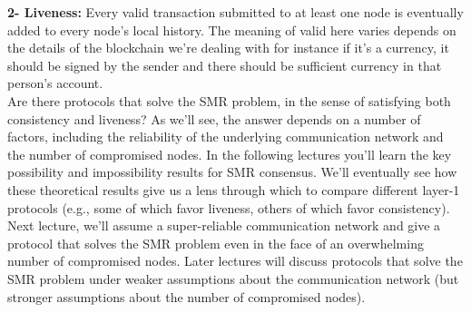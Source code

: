 \noindent
\textbf{2- Liveness:} Every valid transaction submitted to at least one node is eventually added
to every node’s local history. The meaning of valid here varies depends on the details of the blockchain we're dealing with for instance if it's a currency, it should be signed by the sender and there should be sufficient currency in that person's account.\\
Are there protocols that solve the SMR problem, in the sense of satisfying both consistency and liveness? As we’ll see, the answer depends on a number of factors, including the
reliability of the underlying communication network and the number of compromised nodes.
In the following lectures you’ll learn the key possibility and impossibility results for SMR
consensus. We’ll eventually see how these theoretical results give us a lens through which
to compare different layer-1 protocols (e.g., some of which favor liveness, others of which favor consistency). Next lecture, we’ll assume a super-reliable communication network and
give a protocol that solves the SMR problem even in the face of an overwhelming number of
compromised nodes. Later lectures will discuss protocols that solve the SMR problem under
weaker assumptions about the communication network (but stronger assumptions about the
number of compromised nodes).
